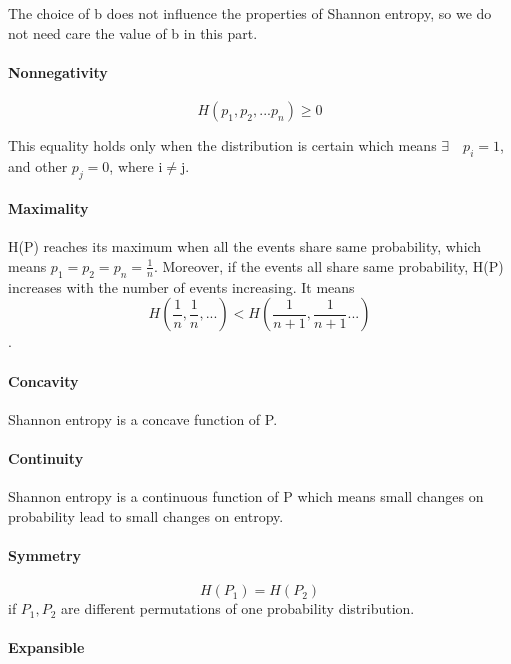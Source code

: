 \documentclass[
]{article}
\begin{document}
The choice of b does not influence the properties of Shannon entropy, so
we do not need care the value of b in this part.

\hypertarget{nonnegativity}{%
\paragraph{Nonnegativity}\label{nonnegativity}}

\[H(p_1,p_2,...p_n)\ge0\]

This equality holds only when the distribution is certain which means
\(\exists\quad p_i=1\), and other \(p_j=0\), where i\(\ne\)j.

\hypertarget{maximality}{%
\paragraph{Maximality}\label{maximality}}

H(P) reaches its maximum when all the events share same probability,
which means \(p_1=p_2=p_n=\frac{1}{n}\). Moreover, if the events all
share same probability, H(P) increases with the number of events
increasing. It means
\[H(\frac{1}{n},\frac{1}{n},...)<H(\frac{1}{n+1},\frac{1}{n+1}...)\].

\hypertarget{concavity}{%
\paragraph{Concavity}\label{concavity}}

Shannon entropy is a concave function of P.

\hypertarget{continuity}{%
\paragraph{Continuity}\label{continuity}}

Shannon entropy is a continuous function of P which means small changes
on probability lead to small changes on entropy.

\hypertarget{symmetry}{%
\paragraph{Symmetry}\label{symmetry}}

\[H(P_1)=H(P_2)\] if \(P_1,P_2\) are different permutations of one
probability distribution.

\hypertarget{expansible}{%
\paragraph{Expansible}\label{expansible}}
\end{document}
